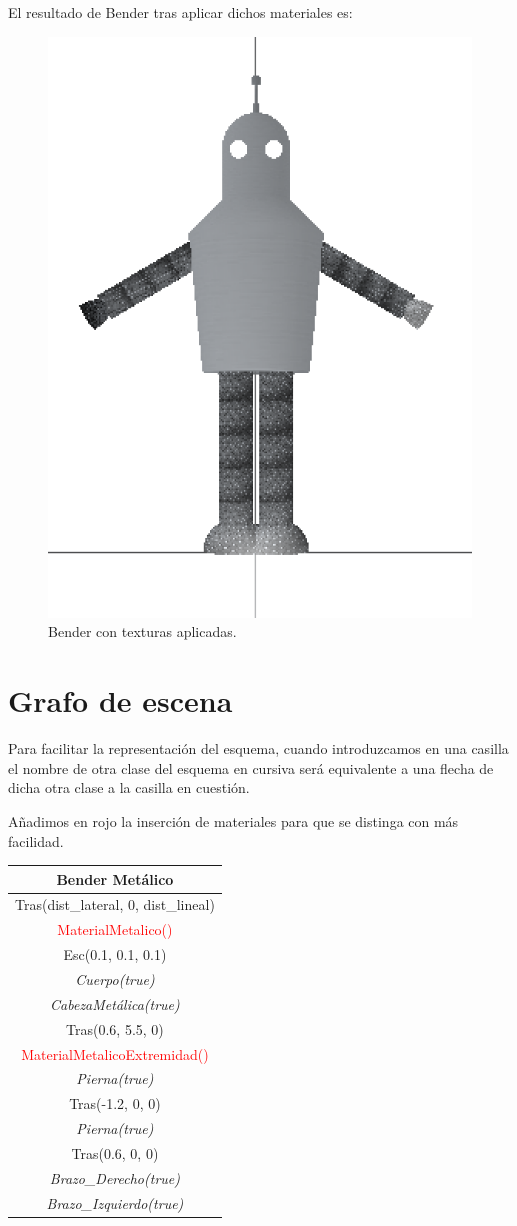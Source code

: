 \documentclass{article}
\begin{document}
El resultado de Bender tras aplicar dichos materiales es:

\begin{figure}[h!]
	\centering
	\includegraphics[width=0.3\linewidth]{bender-textura}
	\caption{Bender con texturas aplicadas.}
	\label{fig:bender-textura}
\end{figure}


\newpage
\section{Grafo de escena}

Para facilitar la representación del esquema, cuando introduzcamos en una casilla el nombre de otra clase del esquema en cursiva será equivalente a una flecha de dicha otra clase a la casilla en cuestión.

Añadimos en rojo la inserción de materiales para que se distinga con más facilidad.

\begin{table}[h]
	\centering
	\label{1}
	\begin{tabular}{|c|}
		\hline
		\textbf{Bender Metálico}\\ \hline
		Tras(dist\_lateral, 0, dist\_lineal)\\ \hline
		\textcolor{red}{MaterialMetalico()}\\ \hline
		Esc(0.1, 0.1, 0.1)\\ \hline
		\textit{Cuerpo(true)}\\ \hline
		\textit{CabezaMetálica(true)}\\ \hline
		Tras(0.6, 5.5, 0)\\ \hline
		\textcolor{red}{MaterialMetalicoExtremidad()}\\ \hline
		\textit{Pierna(true)}\\ \hline
		Tras(-1.2, 0, 0)\\ \hline
		\textit{Pierna(true)}\\ \hline
		Tras(0.6, 0, 0)\\ \hline
		\textit{Brazo\_Derecho(true)}\\ \hline
		\textit{Brazo\_Izquierdo(true)}\\ \hline

	\end{tabular}
\end{table}
\end{document}
